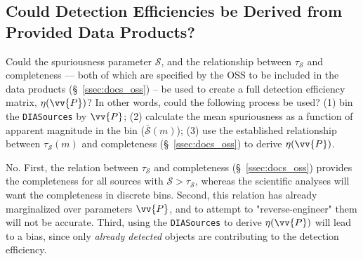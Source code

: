 \documentclass[DM,lsstdraft,toc]{lsstdoc}
\begin{document}

\subsection{Could Detection Efficiencies be Derived from Provided Data Products?}\label{ssec:docs_derDE}

Could the spuriousness parameter $\mathcal{S}$, and the relationship between $\tau_{\mathcal{S}}$ and completeness --- both of which are specified by the OSS to be included in the data products (\S~\ref{ssec:docs_oss}) -- be used to create a full detection efficiency matrix, $\eta(\vv{P})$? In other words, could the following process be used? (1) bin the {\tt DIASources} by $\vv{P}$; (2) calculate the mean spuriousness as a function of apparent magnitude in the bin ($\bar{\mathcal{S}}(m)$); (3) use the established relationship between $\tau_{\mathcal{S}}(m)$ and completeness (\S~\ref{ssec:docs_oss}) to derive $\eta(\vv{P})$.

No. First, the relation between $\tau_{\mathcal{S}}$ and completeness (\S~\ref{ssec:docs_oss}) provides the completeness for all sources with $\mathcal{S}>\tau_{\mathcal{S}}$, whereas the scientific analyses will want the completeness in discrete bins. Second, this relation has already marginalized over parameters $\vv{P}$, and to attempt to "reverse-engineer" them will not be accurate. Third, using the {\tt DIASources} to derive $\eta(\vv{P})$ will lead to a bias, since only {\it already detected} objects are contributing to the detection efficiency. 
\end{document}
